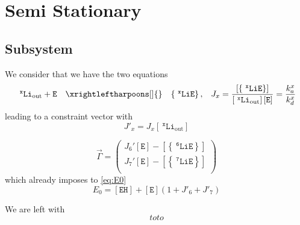 \documentclass[aps,onecolumn,11pt]{revtex4}
\newcommand{\mychem}[1]{\mathtt{#1}}
\newcommand{\myconc}[1]{\left\lbrack{#1}\right\rbrack}
\newcommand{\spLi}[1]{{~^{\mychem{#1}}\mychem{Li}}}
\newcommand{\spEout}{\mychem{E}}
\newcommand{\Eout}{\myconc{\spEout}}
\newcommand{\spLiE}[1]{\left\lbrace\spLi{#1}\spEout\right\rbrace}
\newcommand{\LiE}[1]{\myconc{\spLiE{#1}}}
\newcommand{\spLiOut}[1]{{\spLi{#1}}_{\mathrm{out}}}
\newcommand{\LiOut}[1]{\myconc{\spLiOut{#1}}}
\newcommand{\spEHin}{\mychem{EH}}
\newcommand{\EHin}{\myconc{\spEHin}}
\begin{document}
\section{Semi Stationary}
\subsection{Subsystem}
We consider that we have the two equations
\begin{equation}
	\begin{array}{rcll}
	 \spLiOut{x} +  \spEout &  \xrightleftharpoons[]{} & \spLiE{x}, & J_x = \dfrac{\LiE{x}}{\LiOut{x} \Eout} = \dfrac{k_a^x}{k_d^x}\\
	 \end{array}
\end{equation}
leading to a constraint vector
with 
\begin{equation}
	J'_x = J_x \LiOut{x}
\end{equation}

\begin{equation}
\vec{\Gamma} = 
\begin{pmatrix}
	J_6' \Eout - \LiE{6} \\
	J_7' \Eout - \LiE{7} \\
\end{pmatrix}
\end{equation}
which already imposes to \eqref{eq:E0}
\begin{equation}
	E_0 = \EHin + \Eout \left(1+J'_6+J'_7\right)
\end{equation}

We are left with
\begin{equation}
	toto
\end{equation}
\end{document}
